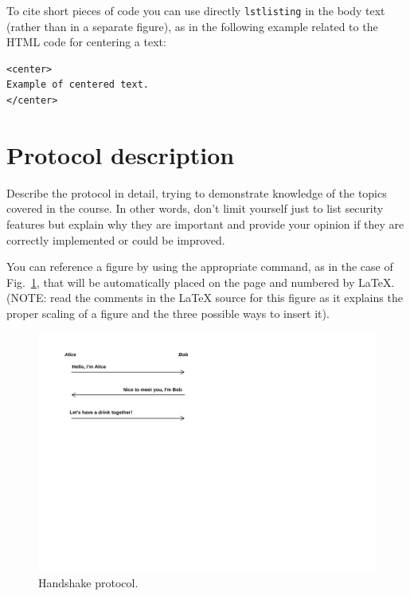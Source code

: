 \documentclass[a4paper,12pt]{article}
\def\myfig#1{Fig.~#1\xspace}
\newcommand{\cmd}[1]{\texttt{#1}\xspace}
\begin{document}
To cite short pieces of code you can use directly \cmd{lstlisting} in the body text (rather than in a separate figure), as in the following example related to the HTML code for centering a text:
\begin{lstlisting}
<center>
Example of centered text.
</center>
\end{lstlisting}


\section{Protocol description}

Describe the protocol in detail, trying to demonstrate knowledge
of the topics covered in the course. In other words, don't limit
yourself just to list security features but explain why they are
important and provide your opinion if they are correctly implemented
or could be improved.

You can reference a figure by using the appropriate command,
as in the case of \myfig{\ref{fig:handshake}},
that will be automatically placed on the page and numbered by LaTeX.
(NOTE: read the comments in the LaTeX source for this figure as it explains the proper scaling of a figure and the three possible ways to insert it).

\begin{figure}
\centerline{\includegraphics{handshake.pdf}}
\caption{Handshake protocol.}
\label{fig:handshake}
\end{figure}
\end{document}
